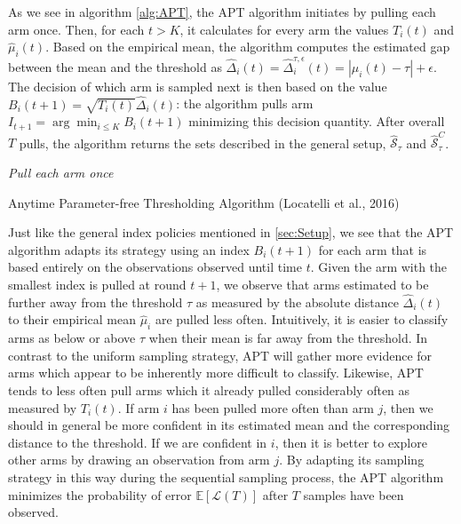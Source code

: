 \documentclass[11pt,]{article}
\begin{document}
As we see in algorithm \ref{alg:APT}, the APT algorithm initiates by
pulling each arm once. Then, for each \(t > K\), it calculates for every
arm the values \(T_i(t)\) and \(\hat{\mu}_i(t)\). Based on the empirical
mean, the algorithm computes the estimated gap between the mean and the
threshold as
\(\hat{\Delta}_i(t) = \hat{\Delta}_i^{\tau, \epsilon}(t) = |\mu_i(t) - \tau| + \epsilon\).
The decision of which arm is sampled next is then based on the value
\(B_i(t+1) = \sqrt{T_i(t)} \hat{\Delta}_i(t)\): the algorithm pulls arm
\(I_{t+1} = \arg \min_{i\leq K} B_i(t+1)\) minimizing this decision
quantity. After overall \(T\) pulls, the algorithm returns the sets
described in the general setup, \(\hat{\mathcal{S}}_{\tau}\) and
\(\hat{\mathcal{S}}^C_{\tau}\).

\IncMargin{1em}

\begin{algorithm}
\Input{$\tau$, $\epsilon$}
\BlankLine
\emph{Pull each arm once}\;
\caption{Anytime Parameter-free Thresholding Algorithm (Locatelli et al., 2016)}\label{alg:APT}
\end{algorithm}

\DecMargin{1em}

Just like the general index policies mentioned in \autoref{sec:Setup},
we see that the APT algorithm adapts its strategy using an index
\(B_i(t+1)\) for each arm that is based entirely on the observations
observed until time \(t\). Given the arm with the smallest index is
pulled at round \(t+1\), we observe that arms estimated to be further
away from the threshold \(\tau\) as measured by the absolute distance
\(\hat{\Delta}_i(t)\) to their empirical mean \(\hat{\mu}_i\) are pulled
less often. Intuitively, it is easier to classify arms as below or above
\(\tau\) when their mean is far away from the threshold. In contrast to
the uniform sampling strategy, APT will gather more evidence for arms
which appear to be inherently more difficult to classify. Likewise, APT
tends to less often pull arms which it already pulled considerably often
as measured by \(T_i(t)\). If arm \(i\) has been pulled more often than
arm \(j\), then we should in general be more confident in its estimated
mean and the corresponding distance to the threshold. If we are
confident in \(i\), then it is better to explore other arms by drawing
an observation from arm \(j\). By adapting its sampling strategy in this
way during the sequential sampling process, the APT algorithm minimizes
the probability of error \(\mathbb{E}[\mathcal{L}(T)]\) after \(T\)
samples have been observed.
\end{document}

